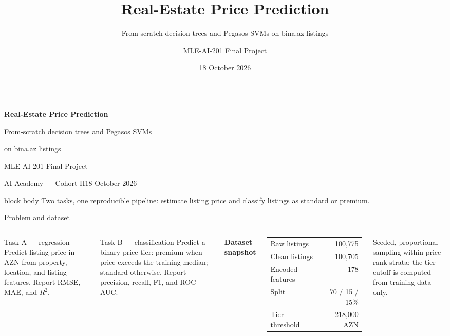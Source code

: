 \documentclass[aspectratio=169,10pt]{beamer}
\title[Real-estate ML]{Real-Estate Price Prediction}
\subtitle{From-scratch decision trees and Pegasos SVMs on bina.az listings}
\author{MLE-AI-201 Final Project}
\institute{AI Academy --- Cohort II}
\date{18 October 2026}
\begin{document}
\begin{frame}[plain]
  \vspace{1.3cm}
  {\color{teal}\rule{0.12\linewidth}{3pt}}\par\vspace{0.45cm}
  {\LARGE\bfseries Real-Estate Price Prediction\par}
  \vspace{0.3cm}
  {\large From-scratch decision trees and Pegasos SVMs\par}
  \vspace{0.15cm}
  {\large on bina.az listings\par}
  \vspace{0.9cm}
  {\normalsize MLE-AI-201 Final Project\par}
  {\small AI Academy --- Cohort II\hfill 18 October 2026\par}
  \vfill
  \begin{beamercolorbox}[wd=\linewidth,sep=0.8em,rounded=true]{block body}
    Two tasks, one reproducible pipeline: estimate listing price and classify
    listings as standard or premium.
  \end{beamercolorbox}
\end{frame}

\begin{frame}{Problem and dataset}
  \begin{columns}[T,onlytextwidth]
      \begin{block}{Task A --- regression}
        Predict listing price in AZN from property, location, and listing
        features. Report RMSE, MAE, and $R^2$.
      \end{block}
      \begin{block}{Task B --- classification}
        Predict a binary price tier: premium when price exceeds the training
        median; standard otherwise. Report precision, recall, F1, and ROC-AUC.
      \end{block}
      \small\bfseries Dataset snapshot\par\vspace{0.25cm}
      \scriptsize
      \begin{tabular}{@{}lr@{}}
        Raw listings & 100,775\\
        Clean listings & 100,705\\
        Encoded features & 178\\
        Split & 70 / 15 / 15\%\\
        Tier threshold & 218,000 AZN\\
      \end{tabular}
      \vspace{0.4cm}\par
      \small\raggedright
      Seeded, proportional sampling within price-rank strata; the tier cutoff
      is computed from training data only.
  \end{columns}
\end{frame}
\end{document}
